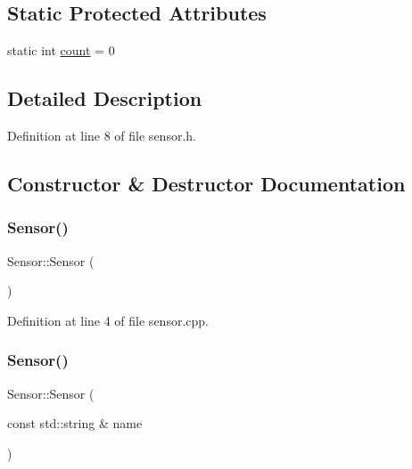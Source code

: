 \subsection*{Static Protected Attributes}
\begin{DoxyCompactItemize}
\item 
static int \hyperlink{class_sensor_a67c286c0fd237d5acda6a5b4b99d8aad}{count} = 0
\end{DoxyCompactItemize}


\subsection{Detailed Description}


Definition at line 8 of file sensor.\+h.



\subsection{Constructor \& Destructor Documentation}
\mbox{\label{class_sensor_a342d6d11ef572c8cba92cb76fb1a294b}} 
\subsubsection{\texorpdfstring{Sensor()}{Sensor()}\hspace{0.1cm}{\footnotesize\ttfamily [1/2]}}
{\footnotesize\ttfamily Sensor\+::\+Sensor (\begin{DoxyParamCaption}{ }\end{DoxyParamCaption})\hspace{0.3cm}{\ttfamily [explicit]}}



Definition at line 4 of file sensor.\+cpp.

\mbox{\label{class_sensor_aa84aad87186b00eb99dd93033bc0cb30}} 
\subsubsection{\texorpdfstring{Sensor()}{Sensor()}\hspace{0.1cm}{\footnotesize\ttfamily [2/2]}}
{\footnotesize\ttfamily Sensor\+::\+Sensor (\begin{DoxyParamCaption}\item[{const std\+::string \&}]{name }\end{DoxyParamCaption})\hspace{0.3cm}{\ttfamily [explicit]}}



